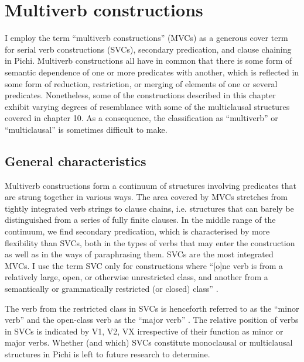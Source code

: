\chapter{Multiverb constructions}

I employ the term “multiverb constructions” (MVCs) as a generous cover term for serial verb constructions (SVCs), secondary predication, and clause chaining in Pichi. Multiverb constructions all have in common that there is some form of semantic dependence of one or more predicates with another, which is reflected in some form of reduction, restriction, or merging of elements of one or several predicates. Nonetheless, some of the constructions described in this chapter exhibit varying degrees of resemblance with some of the multiclausal structures covered in chapter 10. As a consequence, the classification as “multiverb” or “multiclausal” is sometimes difficult to make.

\section{General characteristics}\label{sec:11.1}

Multiverb constructions form a continuum of structures involving predicates that are strung together in various ways. The area covered by MVCs stretches from tightly integrated verb strings to clause chains, i.e. structures that can barely be distinguished from a series of fully finite clauses. In the middle range of the continuum, we find secondary predication, which is characterised by more flexibility than SVCs, both in the types of verbs that may enter the construction as well as in the ways of paraphrasing them. SVCs are the most integrated MVCs. I use the term SVC only for constructions where “[o]ne verb is from a relatively large, open, or otherwise unrestricted class, and another from a semantically or grammatically restricted (or closed) class” \citep[21]{Aikhenvald2006}.


The verb from the restricted class in SVCs is henceforth referred to as the “minor verb” and the open-class verb as the “major verb” \citep{Durie1997}. The relative position of verbs in SVCs is indicated by V1, \textsc{V2,} \textsc{VX} irrespective of their function as minor or major verbs. Whether (and which) SVCs constitute monoclausal or multiclausal structures in Pichi is left to future research to determine.



